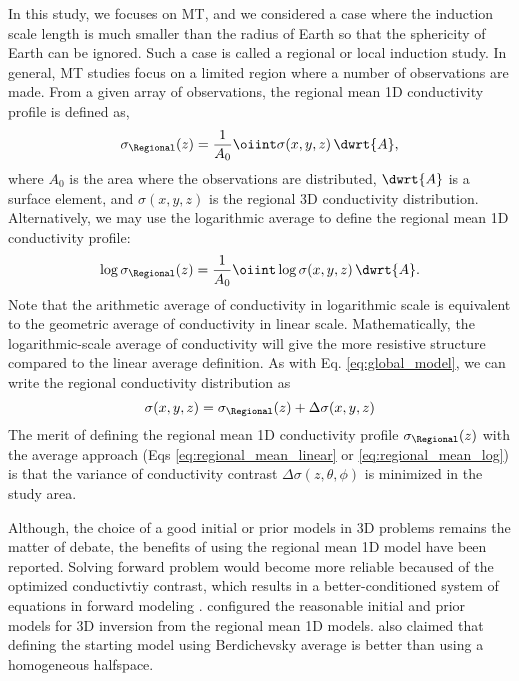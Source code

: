 	In this study, we focuses on MT, and we considered a case where the induction scale length is much smaller than the radius of Earth so that the sphericity of Earth can be ignored. Such a case is called a regional or local induction study. In general, MT studies focus on a limited region where a number of observations are made. From a given array of observations, the regional mean 1D conductivity profile is defined as,
	\begin{equation}\label{eq:regional_mean_linear}
		\sigma_\Regional(z) = \frac{1}{A_0} \oiint \sigma(x,y,z)\, \dwrt{A},
	\end{equation}
	where $A_0$ is the area where the observations are distributed, $\dwrt{A}$ is a surface element, and $\sigma(x,y,z)$ is the regional 3D conductivity distribution. Alternatively, 
	we may use the logarithmic average to define the regional mean 1D conductivity profile:
	\begin{equation}\label{eq:regional_mean_log}
		\log \sigma_\Regional(z) = \frac{1}{A_0} \oiint \log \sigma(x,y,z)\, \dwrt{A}.
	\end{equation}
	Note that the arithmetic average of conductivity in logarithmic scale is equivalent to the geometric average of conductivity in linear scale. Mathematically, the logarithmic-scale average of conductivity will give the more resistive structure compared to the linear average definition.
	As with Eq. \eqref{eq:global_model}, we can write the regional conductivity distribution as
	\begin{equation}\label{eq:regional_model}
		\sigma(x,y,z) = \sigma_\Regional(z) + \Delta\sigma(x,y,z)
	\end{equation}	
	The merit of defining the regional mean 1D conductivity profile $\sigma_\Regional(z)$ with the average approach (Eqs \ref{eq:regional_mean_linear} or \ref{eq:regional_mean_log}) is that  the variance of conductivity contrast $\Delta\sigma(z,\theta,\phi)$ is minimized in the study area. 
	
	Although, the choice of a good initial or prior models in 3D problems remains the matter of debate, the benefits of using the regional mean 1D model have been reported.
	Solving forward problem would become more reliable becaused of the optimized conductivtiy contrast, which results in a better-conditioned system of equations in forward modeling \citep{avdeev2005a}. \citet{tada2014a} configured the reasonable initial and prior models for 3D inversion from the regional mean 1D models. \citet{avdeeva2015a} also claimed that defining the starting model using Berdichevsky average is better than using a homogeneous halfspace.


